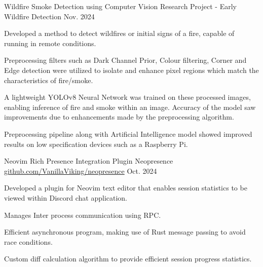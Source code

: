 

\begin{cventries}


  \cventry
    {Wildfire Smoke Detection using Computer Vision} %
    {Research Project - Early Wildfire Detection} %
    {\href{}{}} %
    {Nov. 2024} %
    {
      \begin{cvitems} %
        \item {Developed a method to detect wildfires or initial signs of a fire, capable of running in remote conditions.}
        \item {Preprocessing filters such as Dark Channel Prior, Colour filtering, Corner and Edge detection were utilized to isolate and enhance pixel regions which match the characteristics of fire/smoke.}
        \item {A lightweight YOLOv8 Neural Network was trained on these processed images, enabling inference of fire and smoke within an image. Accuracy of the model saw improvements due to enhancements made by the preprocessing algorithm.}
        \item {Preprocessing pipeline along with Artificial Intelligence model showed improved results on low specification devices such as a Raspberry Pi.}
      \end{cvitems}
    }

  \cventry
    {Neovim Rich Presence Integration Plugin} %
    {Neopresence} %
    {\href{https://github.com/VanillaViking/neopresence}{github.com/VanillaViking/neopresence}} %
    {Oct. 2024} %
    {
      \begin{cvitems} %
        \item {Developed a plugin for Neovim text editor that enables session statistics to be viewed within Discord chat application.}
        \item {Manages Inter process communication using RPC.}
        \item {Efficient asynchronous program, making use of Rust message passing to avoid race conditions.}
        \item {Custom diff calculation algorithm to provide efficient session progress statistics.}
      \end{cvitems}
    }


\end{cventries}
